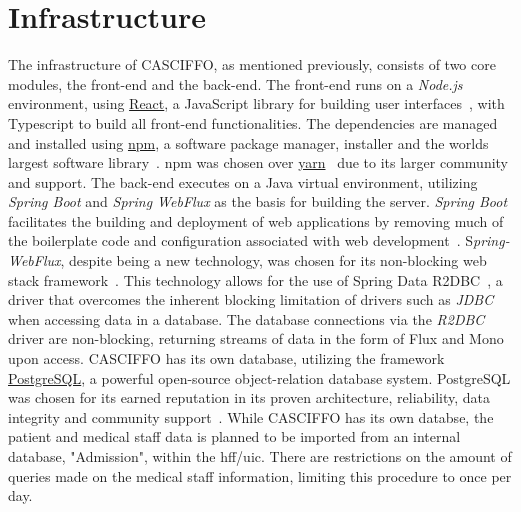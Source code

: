 \section{Infrastructure}
\label{sec:infrastructure}
The infrastructure of CASCIFFO, as mentioned previously, consists of two core modules, the front-end and the back-end.  
The front-end runs on a \textit{Node.js} environment, using \href{https://reactjs.org/}{React}, a JavaScript library for building user interfaces~\cite{reactjs},  with Typescript to build all front-end functionalities. The dependencies are managed and installed using \href{https://docs.npmjs.com/about-npm}{npm}, a software package manager, installer and the worlds largest software library~\cite{npm}. npm was chosen over \href{https://yarnpkg.com/}{yarn}~\cite{yarn} due to its larger community and support.
The back-end executes on a Java virtual environment, utilizing \textit{Spring Boot} and \textit{Spring WebFlux} as the basis for building the server. \textit{Spring Boot} facilitates the building and deployment of web applications by removing much of the boilerplate code and configuration associated with web development~\cite{spring-boot}. S\textit{pring-WebFlux}, despite being a new technology, was chosen for its non-blocking web stack framework~\cite{spring-webflux}. This technology allows for the use of Spring Data R2DBC~\cite{r2dbc}, a driver that overcomes the inherent blocking limitation of drivers such as \textit{JDBC} when accessing data in a database. The database connections via the \textit{R2DBC} driver are non-blocking, returning streams of data in the form of Flux and Mono upon access.
CASCIFFO has its own database, utilizing the framework \href{https://www.postgresql.org/about/}{PostgreSQL}, a powerful open-source object-relation database system. PostgreSQL was chosen for its earned reputation in its proven architecture, reliability, data integrity and community support~\cite{postgresql}. While CASCIFFO has its own databse, the patient and medical staff data is planned to be imported from an internal database, "Admission", within the \acrshort{hff}/\acrshort{uic}. There are restrictions on the amount of queries made on the medical staff information, limiting this procedure to once per day.

